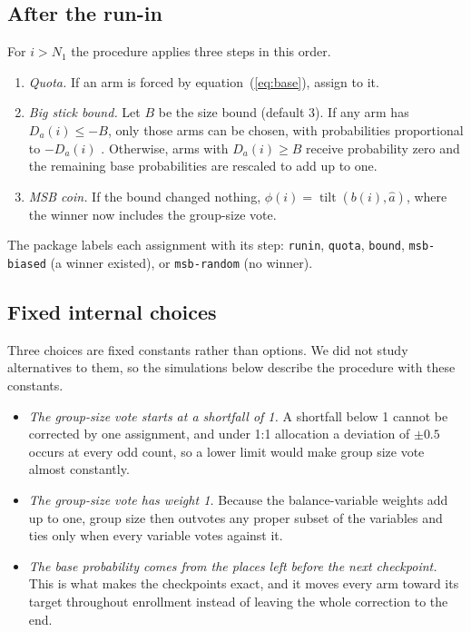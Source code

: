 \documentclass[bib]{statapress}
\begin{document}
\subsection{After the run-in}

For $i > N_1$ the procedure applies three steps in this order.
\begin{enumerate}
\item \emph{Quota.} If an arm is forced by equation~(\ref{eq:base}), assign to
it.
\item \emph{Big stick bound.} Let $B$ be the size bound (default 3). If any arm
has $D_a(i) \le -B$, only those arms can be chosen, with probabilities
proportional to $-D_a(i)$ \citep{soares1983}. Otherwise, arms with
$D_a(i) \ge B$ receive probability zero and the remaining base probabilities are
rescaled to add up to one.
\item \emph{MSB coin.} If the bound changed nothing,
$\phi(i) = \operatorname{tilt}(b(i), \hat a)$, where the winner now includes the
group-size vote.
\end{enumerate}
The package labels each assignment with its step: \texttt{runin},
\texttt{quota}, \texttt{bound}, \texttt{msb-biased} (a winner existed), or
\texttt{msb-random} (no winner).

\subsection{Fixed internal choices}

Three choices are fixed constants rather than options. We did not study
alternatives to them, so the simulations below describe the procedure with
these constants.
\begin{itemize}
\item \emph{The group-size vote starts at a shortfall of 1.} A shortfall below
1 cannot be corrected by one assignment, and under 1:1 allocation a deviation of
$\pm 0.5$ occurs at every odd count, so a lower limit would make group size vote
almost constantly.
\item \emph{The group-size vote has weight 1.} Because the balance-variable
weights add up to one, group size then outvotes any proper subset of the
variables and ties only when every variable votes against it.
\item \emph{The base probability comes from the places left before the next
checkpoint.} This is what makes the checkpoints exact, and it moves every arm
toward its target throughout enrollment instead of leaving the whole correction
to the end.
\end{itemize}
\end{document}

